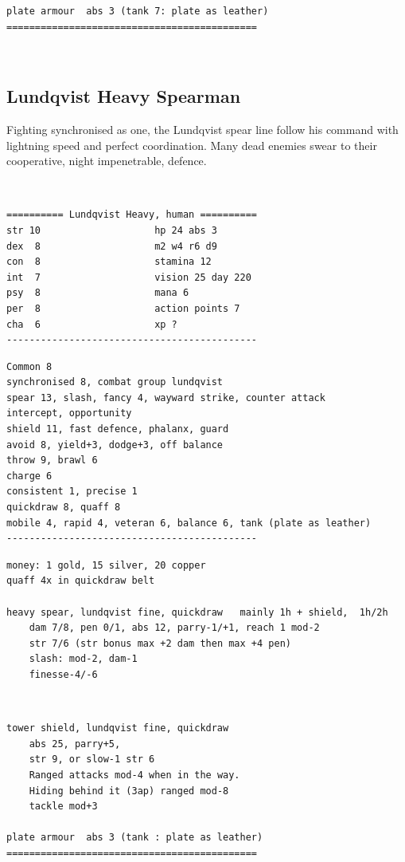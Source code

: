 \begin{samepage}
\begin{verbatim}
plate armour  abs 3 (tank 7: plate as leather)
============================================
\end{verbatim} \end{samepage} \normalsize

\


\subsection*{Lundqvist Heavy Spearman}

Fighting synchronised as one, the Lundqvist spear line follow his command with lightning speed and perfect coordination. Many dead enemies swear to their cooperative, night impenetrable, defence.

\

\goodbreak \small \begin{samepage} \begin{verbatim}
========== Lundqvist Heavy, human ==========
str 10                    hp 24 abs 3
dex  8                    m2 w4 r6 d9
con  8                    stamina 12
int  7                    vision 25 day 220
psy  8                    mana 6
per  8                    action points 7
cha  6                    xp ?
--------------------------------------------
\end{verbatim} \goodbreak \begin{verbatim}
Common 8
synchronised 8, combat group lundqvist
spear 13, slash, fancy 4, wayward strike, counter attack
intercept, opportunity
shield 11, fast defence, phalanx, guard
avoid 8, yield+3, dodge+3, off balance
throw 9, brawl 6
charge 6
consistent 1, precise 1
quickdraw 8, quaff 8
mobile 4, rapid 4, veteran 6, balance 6, tank (plate as leather)
--------------------------------------------
\end{verbatim} \goodbreak \begin{verbatim}
money: 1 gold, 15 silver, 20 copper
quaff 4x in quickdraw belt

heavy spear, lundqvist fine, quickdraw   mainly 1h + shield,  1h/2h
    dam 7/8, pen 0/1, abs 12, parry-1/+1, reach 1 mod-2
    str 7/6 (str bonus max +2 dam then max +4 pen)
    slash: mod-2, dam-1
    finesse-4/-6
\end{verbatim} \end{samepage}   \   \goodbreak \begin{samepage} \begin{verbatim}
tower shield, lundqvist fine, quickdraw
    abs 25, parry+5,
    str 9, or slow-1 str 6
    Ranged attacks mod-4 when in the way.
    Hiding behind it (3ap) ranged mod-8
    tackle mod+3

plate armour  abs 3 (tank : plate as leather)
============================================
\end{verbatim} \end{samepage} \normalsize

